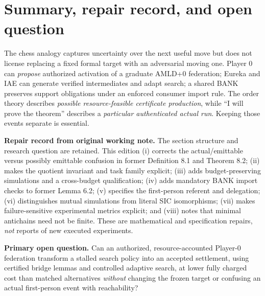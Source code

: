 \documentclass[11pt,letterpaper]{article}
\theoremstyle{remark}
\begin{document}
\section{Summary, repair record, and open question}
The chess analogy captures uncertainty over the next useful move but does not license replacing a fixed formal target with an adversarial moving one. Player 0 can \emph{propose} authorized activation of a graduate AMLD+0 federation; Eureka and IAE can generate verified intermediates and adapt search; a shared BANK preserves support obligations under an enforced consumer import rule. The order theory describes \emph{possible resource-feasible certificate production}, while ``I will prove the theorem'' describes a \emph{particular authenticated actual run}. Keeping those events separate is essential.

\textbf{Repair record from original working note.} The section structure and research question are retained. This edition (i) corrects the actual/emittable versus possibly emittable confusion in former Definition 8.1 and Theorem 8.2; (ii) makes the quotient invariant and task family explicit; (iii) adds budget-preserving simulations and a cross-budget qualification; (iv) adds mandatory BANK import checks to former Lemma 6.2; (v) specifies the first-person referent and delegation; (vi) distinguishes mutual simulations from literal SIC isomorphisms; (vii) makes failure-sensitive experimental metrics explicit; and (viii) notes that minimal antichains need not be finite. These are mathematical and specification repairs, \emph{not} reports of new executed experiments.

\textbf{Primary open question.} Can an authorized, resource-accounted Player-0 federation transform a stalled search policy into an accepted settlement, using certified bridge lemmas and controlled adaptive search, at lower fully charged cost than matched alternatives \emph{without} changing the frozen target or confusing an actual first-person event with reachability?
\end{document}
